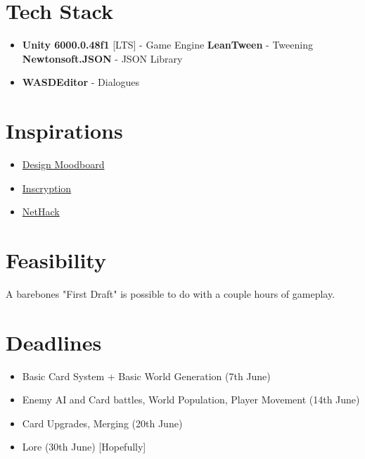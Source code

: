 \documentclass[10pt, a4paper]{article}
\begin{document}
	\section{Tech Stack}
		\begin{itemize}
			\item \textbf{Unity 6000.0.48f1} [LTS] - Game Engine
			\subitem \textbf{LeanTween} - Tweening
			\subitem \textbf{Newtonsoft.JSON} - JSON Library
			\item \textbf{WASDEditor} - Dialogues
		\end{itemize}
	\section{Inspirations}
	\begin{itemize}
		\item \href{https://www.figma.com/design/Zb3b7Vf4XvZ4UPItO0jaNE/Deck-Builder}{Design Moodboard}
		\item \href{https://www.inscryption.com}{Inscryption}
		\item \href{https://www.nethack.org}{NetHack}
	\end{itemize}
	
	\section{Feasibility}
	A barebones "First Draft" is possible to do with a couple hours of gameplay.
	
	\section{Deadlines}
	\begin{itemize}
	\item Basic Card System + Basic World Generation (7th June)
	\item Enemy AI and Card battles, World Population, Player Movement (14th June)
	\item Card Upgrades, Merging (20th June)
	\item Lore (30th June) [Hopefully]
	\end{itemize}
\end{document}
